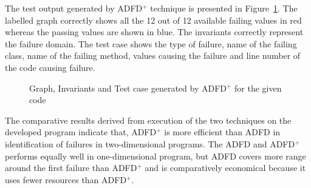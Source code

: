 \documentclass[runningheads,a4paper]{llncs}
\begin{document}
The test output generated by ADFD$^+$ technique is presented in Figure~\ref{fig:ADFD+}. The labelled graph correctly shows all the 12 out of 12 available failing values in red whereas the passing values are shown in blue. The invariants correctly represent the failure domain. The test case shows the type of failure, name of the failing class, name of the failing method, values causing the failure and line number of the code causing failure.

\begin{figure}[h]
%
\caption{Graph, Invariants and Test case generated by ADFD$^+$ for the given code}
\label{fig:ADFD+}
\end{figure}


The comparative results derived from execution of the two techniques on the developed program indicate that, ADFD$^+$ is more efficient than ADFD in identification of failures in two-dimensional programs. The ADFD and ADFD$^+$ performs equally well in one-dimensional program, but ADFD covers more range around the first failure than ADFD$^+$ and is comparatively economical because it uses fewer resources than ADFD$^+$.





\end{document}
